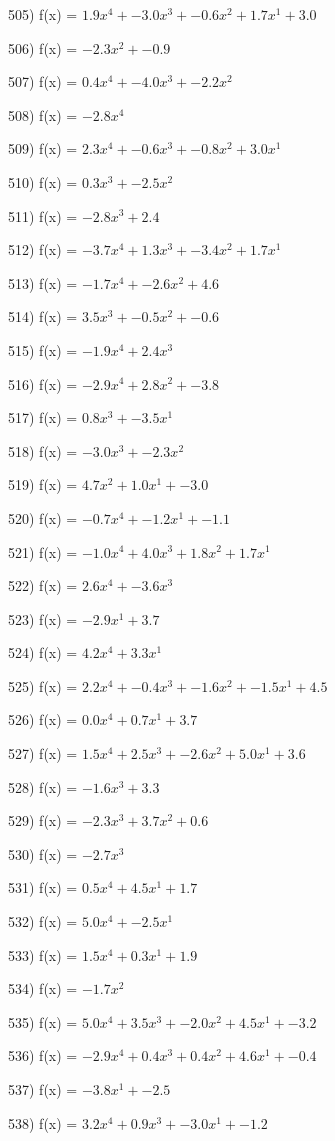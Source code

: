 \documentclass[10pt,a4paper]{article}
\begin{document}
505) f(x) = $1.9x^4 + -3.0x^3 + -0.6x^2 + 1.7x^1 + 3.0$

506) f(x) = $-2.3x^2 + -0.9$

507) f(x) = $0.4x^4 + -4.0x^3 + -2.2x^2$

508) f(x) = $-2.8x^4$

509) f(x) = $2.3x^4 + -0.6x^3 + -0.8x^2 + 3.0x^1$

510) f(x) = $0.3x^3 + -2.5x^2$

511) f(x) = $-2.8x^3 + 2.4$

512) f(x) = $-3.7x^4 + 1.3x^3 + -3.4x^2 + 1.7x^1$

513) f(x) = $-1.7x^4 + -2.6x^2 + 4.6$

514) f(x) = $3.5x^3 + -0.5x^2 + -0.6$

515) f(x) = $-1.9x^4 + 2.4x^3$

516) f(x) = $-2.9x^4 + 2.8x^2 + -3.8$

517) f(x) = $0.8x^3 + -3.5x^1$

518) f(x) = $-3.0x^3 + -2.3x^2$

519) f(x) = $4.7x^2 + 1.0x^1 + -3.0$

520) f(x) = $-0.7x^4 + -1.2x^1 + -1.1$

521) f(x) = $-1.0x^4 + 4.0x^3 + 1.8x^2 + 1.7x^1$

522) f(x) = $2.6x^4 + -3.6x^3$

523) f(x) = $-2.9x^1 + 3.7$

524) f(x) = $4.2x^4 + 3.3x^1$

525) f(x) = $2.2x^4 + -0.4x^3 + -1.6x^2 + -1.5x^1 + 4.5$

526) f(x) = $0.0x^4 + 0.7x^1 + 3.7$

527) f(x) = $1.5x^4 + 2.5x^3 + -2.6x^2 + 5.0x^1 + 3.6$

528) f(x) = $-1.6x^3 + 3.3$

529) f(x) = $-2.3x^3 + 3.7x^2 + 0.6$

530) f(x) = $-2.7x^3$

531) f(x) = $0.5x^4 + 4.5x^1 + 1.7$

532) f(x) = $5.0x^4 + -2.5x^1$

533) f(x) = $1.5x^4 + 0.3x^1 + 1.9$

534) f(x) = $-1.7x^2$

535) f(x) = $5.0x^4 + 3.5x^3 + -2.0x^2 + 4.5x^1 + -3.2$

536) f(x) = $-2.9x^4 + 0.4x^3 + 0.4x^2 + 4.6x^1 + -0.4$

537) f(x) = $-3.8x^1 + -2.5$

538) f(x) = $3.2x^4 + 0.9x^3 + -3.0x^1 + -1.2$
\end{document}
